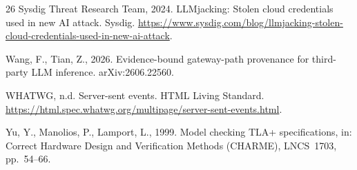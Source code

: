 \documentclass[preprint,3p,authoryear,12pt]{elsarticle}
\begin{document}
\begin{thebibliography}{26}
Sysdig Threat Research Team, 2024. LLMjacking: Stolen cloud credentials used in new AI
attack. Sysdig.
\url{https://www.sysdig.com/blog/llmjacking-stolen-cloud-credentials-used-in-new-ai-attack}.

Wang, F., Tian, Z., 2026. Evidence-bound gateway-path provenance for third-party LLM
inference. arXiv:2606.22560.

WHATWG, n.d. Server-sent events. HTML Living Standard.
\url{https://html.spec.whatwg.org/multipage/server-sent-events.html}.

Yu, Y., Manolios, P., Lamport, L., 1999. Model checking TLA+ specifications, in:
Correct Hardware Design and Verification Methods (CHARME), LNCS~1703, pp.~54--66.

\end{thebibliography}
\end{document}
